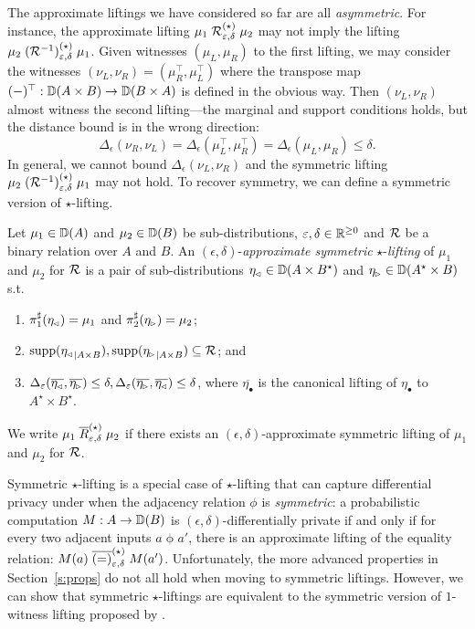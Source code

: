 \documentclass{lmcs}
\begin{document}
The approximate liftings we have considered so far are all \emph{asymmetric}.
For instance, the approximate lifting $\mu_1 \mathrel{\mathrel{\mathcal{R}}^{(\star)}_{\varepsilon, \delta}}
\mu_2$ may not imply the lifting $\mu_2 \mathrel{(\mathrel{\mathcal{R}}^{-1})^{(\star)}_{\varepsilon, \delta}}
\mu_1$. Given witnesses $(\mu_L, \mu_R)$ to the first lifting, we may consider
the witnesses $(\nu_L, \nu_R) = (\mu_R^\top, \mu_L^\top)$ where the
transpose map $(-)^\top : {\mathbb{D}}(A \times B) \to {\mathbb{D}}(B \times A)$ is defined in
the obvious way. Then $(\nu_L, \nu_R)$ almost witness the second lifting---the
marginal and support conditions holds, but the distance bound is in the wrong
direction:
\[
  \Delta_\epsilon(\nu_R, \nu_L)
  = \Delta_\epsilon(\mu_L^\top, \mu_R^\top) 
  = \Delta_\epsilon(\mu_L, \mu_R)
  \leq \delta .
\]
In general, we cannot bound $\Delta_\epsilon(\nu_L, \nu_R)$ and the symmetric
lifting $\mu_2 \mathrel{(\mathrel{\mathcal{R}}^{-1})^{(\star)}_{\varepsilon, \delta}} \mu_1$ may not hold.
To recover symmetry, we can define a symmetric version of $\star$-lifting.
%
\begin{defi}
  Let $\mu_1 \in {\mathbb{D}}(A)$ and $\mu_2 \in {\mathbb{D}}(B)$ be sub-distributions,
  $\varepsilon, \delta \in \mathbb{R}^{\geq 0}$ and $\mathrel{\mathcal{R}}$ be a binary relation over $A
$ and $B$. An $(\epsilon, \delta)$-\emph{approximate symmetric}
  $\star$-\emph{lifting} of $\mu_1$ and $\mu_2$ for $\mathrel{\mathcal{R}}$ is a pair of
  sub-distributions
  $\eta_{\mspace{-1.5mu}{\scriptscriptstyle \vartriangleleft}} \in {\mathbb{D}}(A \times B^\star)$ and
  $\eta_{\mspace{-1.5mu}{\scriptscriptstyle \vartriangleright}} \in {\mathbb{D}}(A^\star \times B)$ s.t.
  \begin{enumerate}
  \item $\pi_{1}^{\sharp}(\eta_{\mspace{-1.5mu}{\scriptscriptstyle \vartriangleleft}}) = \mu_1$ and $\pi_{2}^{\sharp}(\eta_{\mspace{-1.5mu}{\scriptscriptstyle \vartriangleright}}) = \mu_2$;
  \item
    $\operatorname{supp}({\eta_{\mspace{-1.5mu}{\scriptscriptstyle \vartriangleleft}}}_{|A \times B}) ,
     \operatorname{supp}({\eta_{\mspace{-1.5mu}{\scriptscriptstyle \vartriangleright}}}_{|A \times B}) \subseteq \mathcal{R}$; and
  \item $\Delta_{\varepsilon}(
           \overline{\eta_{\mspace{-1.5mu}{\scriptscriptstyle \vartriangleleft}}},
           \overline{\eta_{\mspace{-1.5mu}{\scriptscriptstyle \vartriangleright}}}) \leq \delta,
           \Delta_{\varepsilon}(
           \overline{\eta_{\mspace{-1.5mu}{\scriptscriptstyle \vartriangleright}}},
           \overline{\eta_{\mspace{-1.5mu}{\scriptscriptstyle \vartriangleleft}}}) \leq \delta$,
  where $\overline{\eta_{\bullet}}$ is the canonical lifting of
  $\eta_{\bullet}$ to $A^\star \times B^\star$. 
  \end{enumerate}
  We write
  $\mu_1 \mathrel{\overline{R}^{(\star)}_{\varepsilon, \delta}} \mu_2$
  if there exists an $(\epsilon, \delta)$-approximate symmetric lifting of
  $\mu_1$ and $\mu_2$ for $\mathrel{\mathcal{R}}$.
\end{defi}

Symmetric $\star$-lifting is a special case of $\star$-lifting that can capture
differential privacy under when the adjacency relation $\phi$ is
\emph{symmetric}: a probabilistic computation $M : A \to {\mathbb{D}}(B)$ is
$(\epsilon, \delta)$-differentially private if and only if for every two
adjacent inputs $a \mathrel{\phi} a'$, there is an approximate lifting of the
equality relation: $M(a) \mathrel{\overline{(=)}^{(\star)}_{\varepsilon, \delta}} M(a')$.
Unfortunately, the more advanced properties in Section~\ref{s:props} do not all
hold when moving to symmetric liftings. However, we can show that symmetric
$\star$-liftings are equivalent to the symmetric version of $1$-witness lifting
proposed by \citet{BartheKOZ13}.
\end{document}
